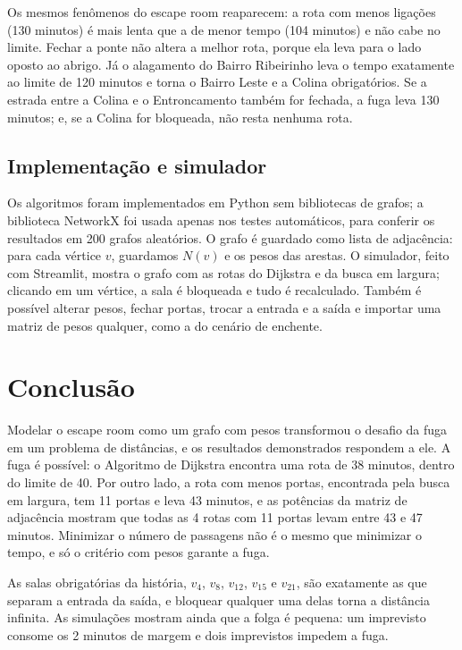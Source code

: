 \documentclass{article}
\theoremstyle{definition}
\theoremstyle{plain}
\begin{document}
Os mesmos fenômenos do escape room reaparecem: a rota com menos ligações
(130 minutos) é mais lenta que a de menor tempo (104 minutos) e não cabe no limite.
Fechar a ponte não altera a melhor rota, porque ela leva para o lado oposto ao
abrigo. Já o alagamento do Bairro Ribeirinho leva o tempo exatamente ao limite de
120 minutos e torna o Bairro Leste e a Colina obrigatórios. Se a estrada entre a
Colina e o Entroncamento também for fechada, a fuga leva 130 minutos; e, se a Colina
for bloqueada, não resta nenhuma rota.

\subsection{Implementação e simulador}

Os algoritmos foram implementados em Python sem bibliotecas de grafos; a
biblioteca NetworkX foi usada apenas nos testes automáticos, para conferir os
resultados em 200 grafos aleatórios. O grafo é guardado como lista de adjacência:
para cada vértice $v$, guardamos $N(v)$ e os pesos das arestas. O simulador,
feito com Streamlit, mostra o grafo com as rotas do Dijkstra e da busca em
largura; clicando em um vértice, a sala é bloqueada e tudo é recalculado. Também é
possível alterar pesos, fechar portas, trocar a entrada e a saída e importar uma
matriz de pesos qualquer, como a do cenário de enchente.

\section{Conclusão}\label{sec:conclusao}

Modelar o escape room como um grafo com pesos transformou o desafio da fuga em um
problema de distâncias, e os resultados demonstrados respondem a ele. A fuga é
possível: o Algoritmo de Dijkstra encontra uma rota de 38 minutos, dentro do
limite de 40. Por outro lado, a rota com menos portas, encontrada pela busca em
largura, tem 11 portas e leva 43 minutos, e as potências da matriz de adjacência
mostram que todas as 4 rotas com 11 portas levam entre 43 e 47 minutos. Minimizar
o número de passagens não é o mesmo que minimizar o tempo, e só o critério com
pesos garante a fuga.

As salas obrigatórias da história, $v_4$, $v_8$, $v_{12}$, $v_{15}$ e $v_{21}$,
são exatamente as que separam a entrada da saída, e bloquear qualquer uma delas
torna a distância infinita. As simulações mostram ainda que a folga é pequena: um
imprevisto consome os 2 minutos de margem e dois imprevistos impedem a fuga.
\end{document}
